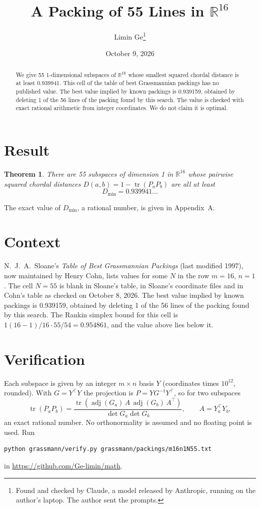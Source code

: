 \documentclass[11pt,a4paper]{article}
\title{A Packing of 55 Lines in $\mathbb{R}^{16}$}
\author{Limin Ge\thanks{Found and checked by Claude, a model released by Anthropic, running on the author's laptop. The author sent the prompts.}}
\date{October 9, 2026}
\newtheorem*{theorem}{Theorem}
\begin{document}
\maketitle
\begin{abstract}
We give 55 1-dimensional subspaces of $\mathbb{R}^{16}$ whose smallest squared chordal distance is at least 0.939941. This cell of the table of best Grassmannian packings has no published value. The best value implied by known packings is 0.939159, obtained by deleting 1 of the 56 lines of the packing found by this search. The value is checked with exact rational arithmetic from integer coordinates. We do not claim it is optimal.
\end{abstract}

\section{Result}
\begin{theorem}
There are 55 subspaces of dimension 1 in $\mathbb{R}^{16}$ whose pairwise squared chordal distances $D(a,b) = 1 - \operatorname{tr}(P_aP_b)$ are all at least
\[ D_{\min} = 0.939941\ldots \]
\end{theorem}
The exact value of $D_{\min}$, a rational number, is given in Appendix~A.


\section{Context}
N.~J.~A.~Sloane's \emph{Table of Best Grassmannian Packings} (last modified 1997), now maintained by Henry Cohn, lists values for some $N$ in the row $m=16$, $n=1$. The cell $N=55$ is blank in Sloane's table, in Sloane's coordinate files and in Cohn's table as checked on October 8, 2026. The best value implied by known packings is 0.939159, obtained by deleting 1 of the 56 lines of the packing found by this search. The Rankin simplex bound for this cell is $1(16-1)/16\cdot 55/54 = 0.954861$, and the value above lies below it.


\section{Verification}
Each subspace is given by an integer $m\times n$ basis $Y$ (coordinates times $10^{12}$, rounded). With $G=Y^\top Y$ the projection is $P=YG^{-1}Y^\top$, so for two subspaces
\[ \operatorname{tr}(P_aP_b)=\frac{\operatorname{tr}(\operatorname{adj}(G_a)\,A\,\operatorname{adj}(G_b)\,A^\top)}{\det G_a\det G_b},\qquad A=Y_a^\top Y_b, \]
an exact rational number. No orthonormality is assumed and no floating point is used. Run
\begin{verbatim}
python grassmann/verify.py grassmann/packings/m16n1N55.txt
\end{verbatim}
in \url{https://github.com/Ge-limin/math}.
\end{document}
